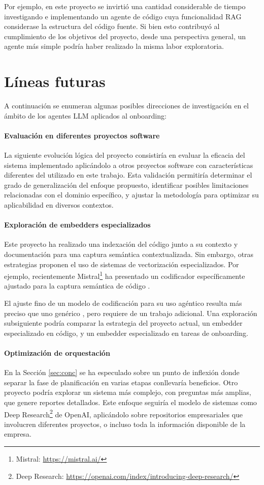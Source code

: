 Por ejemplo, en este proyecto se invirtió una cantidad considerable de tiempo investigando e implementando un agente de código cuya funcionalidad RAG considerase la estructura del código fuente. Si bien esto contribuyó al cumplimiento de los objetivos del proyecto, desde una perspectiva general, un agente más simple podría haber realizado la misma labor exploratoria.

\section{Líneas futuras}
A continuación se enumeran algunas posibles direcciones de investigación en el ámbito de los agentes LLM aplicados al onboarding:

\paragraph{Evaluación en diferentes proyectos software} La siguiente evolución lógica del proyecto consistiría en evaluar la eficacia del sistema implementado aplicándolo a otros proyectos software con características diferentes del utilizado en este trabajo. Esta validación permitiría determinar el grado de generalización del enfoque propuesto, identificar posibles limitaciones relacionadas con el dominio específico, y ajustar la metodología para optimizar su aplicabilidad en diversos contextos.

\paragraph{Exploración de embedders especializados} Este proyecto ha realizado una indexación del código junto a su contexto y documentación para una captura semántica contextualizada. Sin embargo, otras estrategias proponen el uso de sistemas de vectorización especializados. Por ejemplo, recientemente Mistral\footnote{Mistral: \url{https://mistral.ai/}} ha presentado un codificador específicamente ajustado para la captura semántica de código \cite{mistral_codestral_2025}.

El ajuste fino de un modelo de codificación para su uso agéntico resulta más preciso que uno genérico \cite{khattab_relevance-guided_2021,xiong_approximate_2020,yu_augmentation-adapted_2023}, pero requiere de un trabajo adicional. Una exploración subsiguiente podría comparar la estrategia del proyecto actual, un embedder especializado en código, y un embedder especializado en tareas de onboarding.

\paragraph{Optimización de orquestación} En la Sección \ref{sec:conc} se ha especulado sobre un punto de inflexión donde separar la fase de planificación en varias etapas conllevaría beneficios. Otro proyecto podría explorar un sistema más complejo, con preguntas más amplias, que genere reportes detallados. Este enfoque seguiría el modelo de sistemas como Deep Research\footnote{Deep Research: \url{https://openai.com/index/introducing-deep-research/}} de OpenAI, aplicándolo sobre repositorios empresariales que involucren diferentes proyectos, o incluso toda la información disponible de la empresa.

